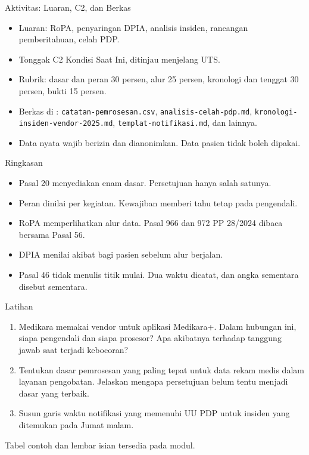 \documentclass[aspectratio=169, table, 12pt]{beamer}
\begin{document}
\begin{frame}{{\Large Aktivitas: Luaran, C2, dan Berkas}}
  \vspace{6pt}
  \small
  \begin{itemize}
    \item Luaran: RoPA, penyaringan DPIA, analisis insiden, rancangan pemberitahuan, celah PDP.
    \item Tonggak C2 Kondisi Saat Ini, ditinjau menjelang UTS.
    \item Rubrik: dasar dan peran 30 persen, alur 25 persen, kronologi dan tenggat 30 persen, bukti
          15 persen.
    \item Berkas di : \texttt{catatan-pemrosesan.csv},
          \texttt{analisis-celah-pdp.md}, \texttt{kronologi-insiden-vendor-2025.md},
          \texttt{templat-notifikasi.md}, dan lainnya.
    \item Data nyata wajib berizin dan dianonimkan. Data pasien tidak boleh dipakai.
  \end{itemize}
\end{frame}

\begin{frame}{{\Large Ringkasan}}
  \vspace{6pt}
  \small
  \begin{itemize}
    \item Pasal 20 menyediakan enam dasar. Persetujuan hanya salah satunya.
    \item Peran dinilai per kegiatan. Kewajiban memberi tahu tetap pada pengendali.
    \item RoPA memperlihatkan alur data. Pasal 966 dan 972 PP 28/2024 dibaca bersama Pasal 56.
    \item DPIA menilai akibat bagi pasien sebelum alur berjalan.
    \item Pasal 46 tidak menulis titik mulai. Dua waktu dicatat, dan angka sementara disebut
          sementara.
  \end{itemize}
\end{frame}

\begin{frame}{{\Large Latihan}}
  \vspace{6pt}
  \small
  \begin{enumerate}
    \item Medikara memakai vendor untuk aplikasi Medikara+. Dalam hubungan ini, siapa pengendali dan
          siapa prosesor? Apa akibatnya terhadap tanggung jawab saat terjadi kebocoran?
    \item Tentukan dasar pemrosesan yang paling tepat untuk data rekam medis dalam layanan
          pengobatan. Jelaskan mengapa persetujuan belum tentu menjadi dasar yang terbaik.
    \item Susun garis waktu notifikasi yang memenuhi UU PDP untuk insiden yang ditemukan pada Jumat
          malam.
  \end{enumerate}

  \vspace{6pt}
  Tabel contoh dan lembar isian tersedia pada modul.
\end{frame}
\end{document}
